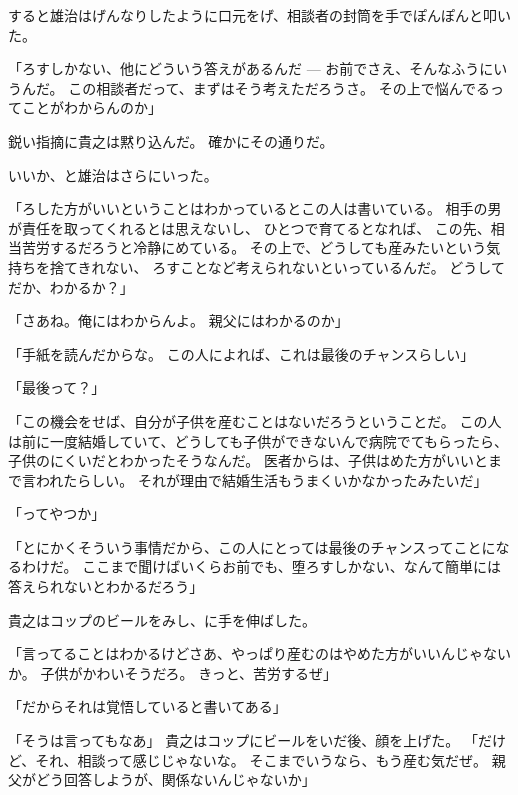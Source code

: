 \documentclass[chapter3.tex]{subfiles}
\begin{document}
\begin{CJK}{UTF8}{ipxm}
    すると雄治はげんなりしたように口元をげ、相談者の封筒を手でぽんぽんと叩いた。

    「ろすしかない、他にどういう答えがあるんだ
    ---
    お前でさえ、そんなふうにいうんだ。
    この相談者だって、まずはそう考えただろうさ。
    その上で悩んでるってことがわからんのか」

    鋭い指摘に貴之は黙り込んだ。
    確かにその通りだ。

    いいか、と雄治はさらにいった。

    「ろした方がいいということはわかっているとこの人は書いている。
    相手の男が責任を取ってくれるとは思えないし、
    ひとつで育てるとなれば、
    この先、相当苦労するだろうと冷静にめている。
    その上で、どうしても産みたいという気持ちを捨てきれない、
    ろすことなど考えられないといっているんだ。
    どうしてだか、わかるか？」

    「さあね。俺にはわからんよ。
    親父にはわかるのか」

    「手紙を読んだからな。
    この人によれば、これは最後のチャンスらしい」

    「最後って？」

    「この機会をせば、自分が子供を産むことはないだろうということだ。
    この人は前に一度結婚していて、どうしても子供ができないんで病院でてもらったら、
    子供のにくいだとわかったそうなんだ。
    医者からは、子供はめた方がいいとまで言われたらしい。
    それが理由で結婚生活もうまくいかなかったみたいだ」

    「ってやつか」

    「とにかくそういう事情だから、この人にとっては最後のチャンスってことになるわけだ。
    ここまで聞けばいくらお前でも、堕ろすしかない、なんて簡単には答えられないとわかるだろう」

    貴之はコップのビールをみし、に手を伸ばした。
    
    「言ってることはわかるけどさあ、やっぱり産むのはやめた方がいいんじゃないか。
    子供がかわいそうだろ。
    きっと、苦労するぜ」

    「だからそれは覚悟していると書いてある」

    「そうは言ってもなあ」
    貴之はコップにビールをいだ後、顔を上げた。
    「だけど、それ、相談って感じじゃないな。
    そこまでいうなら、もう産む気だぜ。
    親父がどう回答しようが、関係ないんじゃないか」


\end{CJK}
\end{document}
